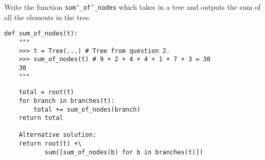 \question Write the function \texttt{sum\char`_of\char`_nodes} which takes in a
tree and outputs the sum of all the elements in the tree.

\begin{lstlisting}
def sum_of_nodes(t):
    """
    >>> t = Tree(...) # Tree from question 2.
    >>> sum_of_nodes(t) # 9 + 2 + 4 + 4 + 1 + 7 + 3 = 30
    30
    """
\end{lstlisting}
\begin{solution}[1in]
\begin{lstlisting}
    total = root(t)
    for branch in branches(t):
        total += sum_of_nodes(branch)
    return total

    Alternative solution:
    return root(t) +\
           sum([sum_of_nodes(b) for b in branches(t)])
\end{lstlisting}
\end{solution}
